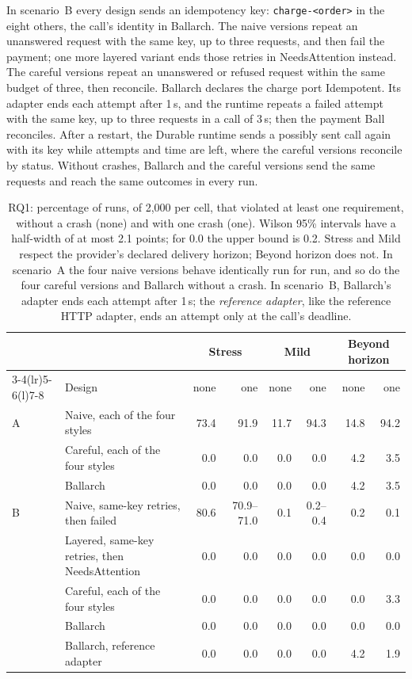 \documentclass[11pt]{article}
\theoremstyle{definition}
\theoremstyle{plain}
\newcommand{\Idem}{\textsf{Idempotent}}
\begin{document}
In scenario~B every design sends an idempotency key: \texttt{charge-<order>} in the eight others, the call's identity in Ballarch. The naive versions repeat an unanswered request with the same key, up to three requests, and then fail the payment; one more layered variant ends those retries in \textsf{NeedsAttention} instead. The careful versions repeat an unanswered or refused request within the same budget of three, then reconcile. Ballarch declares the charge port \Idem. Its adapter ends each attempt after 1\,s, and the runtime repeats a failed attempt with the same key, up to three requests in a call of 3\,s; then the payment Ball reconciles. After a restart, the Durable runtime sends a possibly sent call again with its key while attempts and time are left, where the careful versions reconcile by status. Without crashes, Ballarch and the careful versions send the same requests and reach the same outcomes in every run.

\begin{table}[t]
\centering\footnotesize
\begin{tabular}{@{}llrrrrrr@{}}
\toprule
& & \multicolumn{2}{c}{Stress} & \multicolumn{2}{c}{Mild} & \multicolumn{2}{c}{Beyond horizon} \\
\cmidrule(lr){3-4}\cmidrule(lr){5-6}\cmidrule(l){7-8}
& Design & none & one & none & one & none & one \\
\midrule
A & Naive, each of the four styles & 73.4 & 91.9 & 11.7 & 94.3 & 14.8 & 94.2 \\
  & Careful, each of the four styles & 0.0 & 0.0 & 0.0 & 0.0 & 4.2 & 3.5 \\
  & Ballarch & 0.0 & 0.0 & 0.0 & 0.0 & 4.2 & 3.5 \\
\midrule
B & Naive, same-key retries, then failed & 80.6 & 70.9--71.0 & 0.1 & 0.2--0.4 & 0.2 & 0.1 \\
  & Layered, same-key retries, then \textsf{NeedsAttention} & 0.0 & 0.0 & 0.0 & 0.0 & 0.0 & 0.0 \\
  & Careful, each of the four styles & 0.0 & 0.0 & 0.0 & 0.0 & 0.0 & 3.3 \\
  & Ballarch & 0.0 & 0.0 & 0.0 & 0.0 & 0.0 & 0.0 \\
  & Ballarch, reference adapter & 0.0 & 0.0 & 0.0 & 0.0 & 4.2 & 1.9 \\
\bottomrule
\end{tabular}
\caption{RQ1: percentage of runs, of 2{,}000 per cell, that violated at least one requirement, without a crash (none) and with one crash (one). Wilson 95\% intervals have a half-width of at most 2.1 points; for 0.0 the upper bound is 0.2. Stress and Mild respect the provider's declared delivery horizon; Beyond horizon does not. In scenario~A the four naive versions behave identically run for run, and so do the four careful versions and Ballarch without a crash. In scenario~B, Ballarch's adapter ends each attempt after 1\,s; the \emph{reference adapter}, like the reference HTTP adapter, ends an attempt only at the call's deadline.}
\label{tab:rq1}
\end{table}
\end{document}
